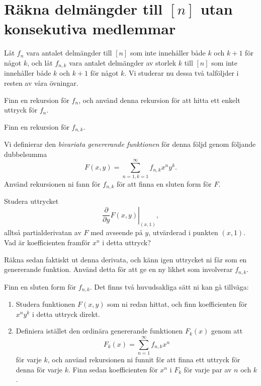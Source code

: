 \documentclass[nobib]{tufte-handout}
\begin{document}
\section{Räkna delmängder till $[n]$ utan konsekutiva medlemmar}

Låt $f_n$ vara antalet delmängder till $[n]$ som inte innehåller både $k$ och $k+1$ för något $k$, och låt $f_{n,k}$ vara antalet delmängder av storlek $k$ till $[n]$ som inte innehåller både $k$ och $k+1$ för något $k$. Vi studerar nu dessa två talföljder i resten av våra övningar.

\begin{xca}\label{xca:subsetcount_easy}
    Finn en rekursion för $f_n$, och använd denna rekursion för att hitta ett enkelt uttryck för $f_n$.
\end{xca}

\begin{xca}\label{xca:subsetcount_hard_multivariate}
    Finn en rekursion för $f_{n,k}$.
    
    Vi definierar den \emph{bivariata genererande funktionen} för denna följd genom följande dubbelsumma
    $$F(x,y) = \sum_{n=1,k=1}^{\infty} f_{n,k} x^n y^k.$$
    Använd rekursionen ni fann för $f_{n,k}$ för att finna en sluten form för $F$.
\end{xca}

\begin{xca}
    Studera uttrycket
    $$\left.\frac{\partial}{\partial y} F(x,y)\right|_{(x,1)},$$
    alltså partialderivatan av $F$ med avseende på $y$, utvärderad i punkten $(x,1)$. Vad är koefficienten framför $x^n$ i detta uttryck?

    Räkna sedan faktiskt ut denna derivata, och känn igen uttrycket ni får som en genererande funktion. Använd detta för att ge en ny likhet som involverar $f_{n,k}$.
\end{xca}

\begin{xca}\label{xca:subsetcount_hard_monovariate}
    Finn en sluten form för $f_{n,k}$. Det finns två huvudsakliga sätt ni kan gå tillväga:
    \begin{enumerate}
        \item Studera funktionen $F(x,y)$ som ni redan hittat, och finn koefficienten för $x^n y^k$ i detta uttryck direkt.
        \item Definiera istället den ordinära genererande funktionen $F_k(x)$ genom att
        $$F_k(x) = \sum_{n=1}^{\infty} f_{n,k}x^n$$
        för varje $k$, och använd rekursionen ni funnit för att finna ett uttryck för denna för varje $k$. Finn sedan koefficienten för $x^n$ i $F_k$ för varje par av $n$ och $k$.
    \end{enumerate}
\end{xca}
\end{document}
